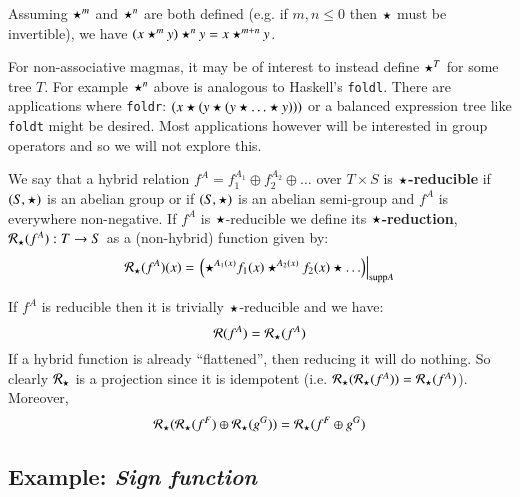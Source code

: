 Assuming $\star^m$ and $\star^n$ are both defined (e.g. if $m,n \leq 0$ then $\star$ must be invertible),
we have $ ( x \star^m y ) \star^n y = x \star^{m+n} y$.

For non-associative magmas, it may be of interest to instead define $\star^T$ for some tree $T$. 
For example $\star^n$ above is analogous to Haskell's \texttt{foldl}.
There are applications where \texttt{foldr}: $(x \star ( y \star ( y \star \ldots \star y)))$ or a balanced expression tree like \texttt{foldt} might be desired.
Most applications however will be interested in group operators and so we will not explore this.

\begin{definition}
	We say that a hybrid relation $f^A = f_1^{A_1} \oplus f_2^{A_2} \oplus \ldots$ over $T \times S$ 
	is $\star$\textbf{-reducible} if $(S, \star)$ is an abelian group 
	or if $(S, \star)$ is an abelian semi-group and $f^A$ is everywhere non-negative.
	If $f^A$ is $\star$-reducible we define its $\star$\textbf{-reduction}, $\mathcal{R}_\star(f^A) :  T \to S$ 
	as a (non-hybrid) function given by:
	\begin{equation}
		\mathcal{R}_\star (f^A)(x) = \left.\left(\star^{A_1(x)} f_1(x) \star^{A_2(x)} f_2(x) \star \ldots \right)\right|_{\text{supp} A}
	\end{equation}
\end{definition}


If $f^A$ is reducible then it is trivially $\star$-reducible and we have:
\begin{equation}
	\mathcal{R}(f^A) = \mathcal{R}_\star(f^A)
\end{equation}
If a hybrid function is already ``flattened'', then reducing it will do nothing.
So clearly $\mathcal{R}_\star$ is a projection since it is idempotent  (i.e. $\mathcal{R}_\star ( \mathcal{R}_\star( f^A)) = \mathcal{R}_\star(f^A)$).
Moreover,
\begin{equation}
	\mathcal{R}_\star( \mathcal{R}_\star(f^F) \oplus \mathcal{R}_\star(g^G)) =\mathcal{R}_\star( f^F \oplus g^G)
\end{equation}


\subsection{Example: \emph{Sign function}}

